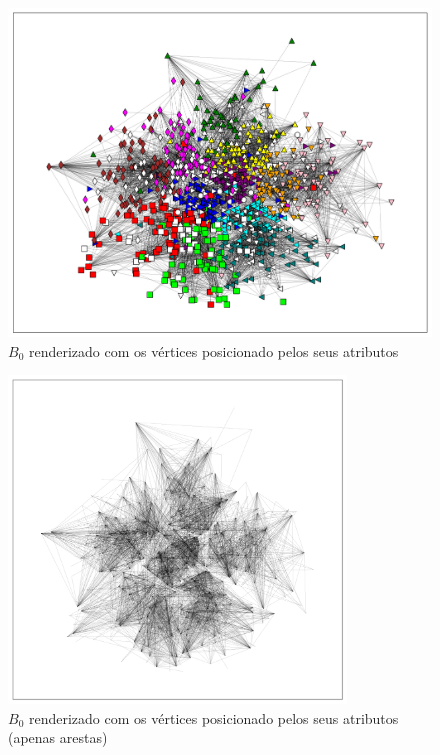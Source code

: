 \documentclass[notes.tex]{subfiles}
\begin{document}
\begin{figure}[htpb]
    \centering
    \caption{$B_0$ renderizado com os vértices posicionado pelos seus atributos}\label{fig:b0_pos}
    \includegraphics[width=\textwidth, height=0.52\textheight]{figures/b0_pos.png}
\end{figure}

\begin{figure}[htpb]
    \centering
    \caption{$B_0$ renderizado com os vértices posicionado pelos seus atributos (apenas arestas)}\label{fig:b0_pos_wires}
    \includegraphics[width=0.8\textwidth, height=0.32\textheight]{figures/b0_pos_wires.png}
\end{figure}


\end{document}
